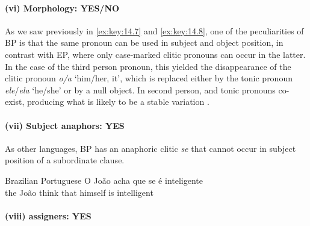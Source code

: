 \documentclass[output=paper]{langsci/langscibook}
\begin{document}
\paragraph*{(vi) Morphology: YES/NO}

As we saw previously in \eqref{ex:key:14.7} and \eqref{ex:key:14.8}, one of the
peculiarities of \gls{BP} is that the same pronoun can be used in subject and
object position, in contrast with \gls{EP}, where only case-marked clitic
pronouns can occur in the latter. In the case of the third person pronoun, this
yielded the disappearance of the clitic pronoun \emph{o/a} ‘him/her, it’, which
is replaced either by the tonic pronoun \emph{ele}/\emph{ela} ‘he/she’ or by a
null object. In second person,  and tonic pronouns co-exist, producing
what is likely to be a stable variation \citep{Galves2019}.

\paragraph*{(vii) Subject anaphors: YES}

As other  languages, \gls{BP} has an anaphoric clitic \emph{se} that
cannot occur in subject position of a subordinate clause.

\ea\label{ex:key:14.28}Brazilian Portuguese
    \gll    \llap{*}O João acha que se é inteligente\\
            the João think that himself is intelligent\\
\z

\paragraph*{(viii) assigners: YES}
\end{document}

